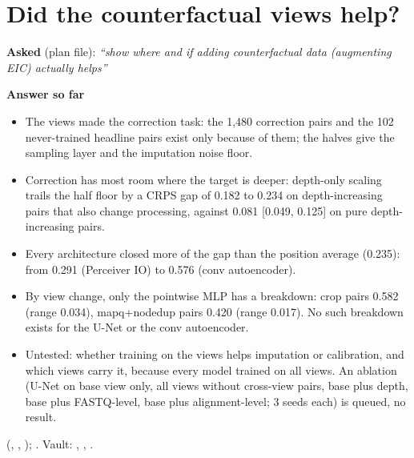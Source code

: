 \documentclass[10pt,letterpaper]{article}
\newcommand{\cl}[1]{#1}
\newcommand{\asked}[1]{\textbf{Asked} (plan file): \emph{``#1''}\par}
\newcommand{\hd}[1]{\textbf{#1}\par}
\begin{document}
\section{Did the counterfactual views help?}
\asked{show where and if adding counterfactual data (augmenting EIC) actually helps}
\cl{\hd{Answer so far}
\begin{itemize}
\item The views made the correction task: the 1,480 correction pairs and the 102 never-trained headline pairs exist only because of them; the halves give the sampling layer and the imputation noise floor.
\item Correction has most room where the target is deeper: depth-only scaling trails the half floor by a CRPS gap of 0.182 to 0.234 on depth-increasing pairs that also change processing, against 0.081 [0.049, 0.125] on pure depth-increasing pairs.
\item Every architecture closed more of the gap than the position average (0.235): from 0.291 (Perceiver IO) to 0.576 (conv autoencoder).
\item By view change, only the pointwise MLP has a breakdown: crop pairs 0.582 (range 0.034), mapq+nodedup pairs 0.420 (range 0.017). No such breakdown exists for the U-Net or the conv autoencoder.
\item Untested: whether training on the views helps imputation or calibration, and which views carry it, because every model trained on all views. An ablation (U-Net on base view only, all views without cross-view pairs, base plus depth, base plus FASTQ-level, base plus alignment-level; 3 seeds each) is queued, no result.
\end{itemize}}
\begin{where}
 (, , ); %
.
Vault: , , .
\end{where}

\end{document}
